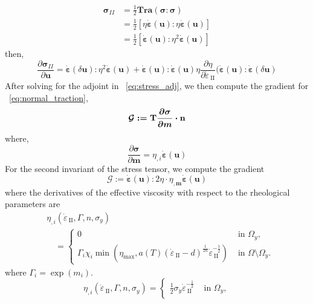 \documentclass[12pt]{article}
\newcommand{\IIinv}{{\dot\varepsilon}_{\mathrm{\!\!\:II}}}
\newcommand{\mm}{{\ensuremath{\boldsymbol{m}}}}
\newcommand{\uu}{{\ensuremath{\boldsymbol{u}}}}
\newcommand{\ssigma}{{\ensuremath{\boldsymbol{\sigma}}}}
\newcommand{\strain}{{\ensuremath{\dot{\boldsymbol{\varepsilon}}}}}
\begin{document}
{\begin{equation}
  \begin{split}
 \ssigma_{II}& = \frac{1}{2}\textbf{Tra}(\ssigma:\ssigma) \\
 & = \frac{1}{2}[\eta\strain(\uu):\eta\strain(\uu)]\\
             & = \frac{1}{2}[\strain(\uu):\eta^2\strain(\uu)]
\end{split}
\end{equation}
then,
\begin{equation}
    \frac{\partial \ssigma_{II}}{\partial \uu} = \strain(\delta \uu):\eta^2\strain(\uu) +
 \strain(\uu):\strain(\uu)\eta\frac{\partial\eta}{\partial \IIinv}(\strain(\uu):\strain(\delta\uu)
\label{eq:stress_adj}
\end{equation}
After solving for the adjoint in ~\eqref{eq:stress_adj}, we then compute the gradient for ~\eqref{eq:normal_traction},
\begin{equation}
\mathcal{G}:=  \boldmath{\mathrm{T}}\frac{\partial{\ssigma}}{{\partial \mm}}\cdot \textbf{n}
\end{equation}
where,
\begin{equation}
\frac{\partial \ssigma}{\partial \mm} = \eta_{,i}\strain(\uu)
\end{equation}
For the second invariant of the stress tensor, we compute the gradient
\begin{equation}
\mathcal G:=  \strain(\uu):2\eta\cdot\eta_{,\mm}\strain(\uu)
\label{eq:grad_iie}
\end{equation}
where the derivatives of the effective viscosity with respect to the rheological parameters are
\begin{align*}
  &\eta_{,i}(\IIinv,\Gamma,n,\sigma_y) \\
  &\quad=\begin{cases}
    0 & \text{ in } \Omega_y,\\
    \Gamma_i\chi_i\min(\eta_{\max},a(T)(\IIinv-d)^{\frac{1}{2n}}\IIinv^{-\frac{1}{2}})
    & \text{ in } \Omega\setminus\Omega_y.
  \end{cases}
\end{align*}
where $\Gamma_i = \exp(m_i)$.
\begin{equation*}
  \eta_{,i}(\IIinv,\Gamma,n,\sigma_y) =
  \begin{cases}
    \frac{1}{2}\sigma_y\IIinv^{-\frac{1}{2}} & \text{ in } \Omega_y,\\

\end{cases}
\end{equation*}}
\end{document}
